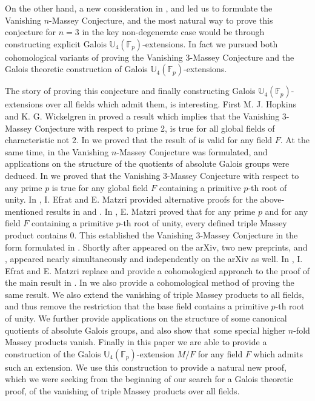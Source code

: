 \documentclass[12pt,leqno]{amsart}
\theoremstyle{plain}
\theoremstyle{definition}
\newcommand{\F}{{\mathbb F}}
\newcommand{\U}{{\mathbb U}}
\begin{document}
 On the other hand, a new consideration in \cite{HW}, \cite{MT1} and \cite{MT2} led us to formulate the Vanishing $n$-Massey Conjecture, and the most natural way to prove this conjecture for $n=3$ in the key non-degenerate case would be through constructing explicit Galois $\U_4(\F_p)$-extensions. 
 In fact we pursued both cohomological variants of proving the Vanishing 3-Massey Conjecture and the Galois theoretic construction of Galois $\U_4(\F_p)$-extensions. 
 
 The story of proving this conjecture and finally constructing Galois $\U_4(\F_p)$-extensions over all fields which admit them, is interesting. 
 First M. J. Hopkins and K. G. \mbox{Wickelgren} in \cite{HW} proved a result which implies that the Vanishing 3-Massey Conjecture with respect to prime 2, is true for all global fields of characteristic not 2. In \cite{MT1} we proved that the result of \cite{HW} is valid for any field $F$. 
 At the same time, in \cite{MT1} the Vanishing $n$-Massey Conjecture was formulated, and applications on the structure of the  quotients of absolute Galois groups were deduced.  
In \cite{MT3} we proved that the Vanishing 3-Massey Conjecture with respect to any prime $p$ is true for any global field $F$ containing a primitive $p$-th root of unity. 
In \cite{EMa}, I. Efrat and E. Matzri provided alternative proofs for the above-mentioned  results in \cite{MT1} and \cite{MT3}.
In \cite{Ma}, E. Matzri  proved that for any prime $p$ and for any field $F$ containing a primitive $p$-th root of unity,  every defined triple Massey product contains 0. This established the Vanishing 3-Massey Conjecture in the form formulated in \cite{MT1}.  Shortly after \cite{Ma} appeared on the arXiv,  two new preprints, \cite{EMa2} and \cite{MT5}, appeared nearly simultaneously and independently on the arXiv as well.  
In \cite{EMa2}, I. Efrat and E. Matzri replace \cite{Ma} and provide a cohomological approach to the proof of the main result in \cite{Ma}. In \cite{MT5} we also provide a cohomological method of proving the same result. We also extend the vanishing of triple Massey products to all fields, and thus remove the restriction that the base field contains a primitive $p$-th root of unity. 
We further provide applications on the structure of  some canonical quotients of absolute Galois groups, and also  show that some special higher $n$-fold Massey products vanish. Finally in this paper we are able to provide a construction of the Galois $\U_4(\F_p)$-extension $M/F$ for any field $F$  which admits such an extension. 
We use this construction to provide a natural new proof, which we were seeking from the beginning of our search for a Galois theoretic proof, of the vanishing of triple Massey products over all fields. 
\end{document}
